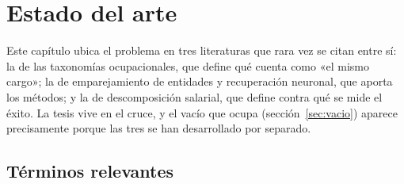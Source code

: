 \documentclass[12pt,a4paper,oneside]{report}
\begin{document}
\chapter{Estado del arte}
\label{cap:relacionados}

Este capítulo ubica el problema en tres literaturas que rara vez se citan entre sí: la de
las taxonomías ocupacionales, que define qué cuenta como «el mismo cargo»; la de
emparejamiento de entidades y recuperación neuronal, que aporta los métodos; y la de
descomposición salarial, que define contra qué se mide el éxito. La tesis vive en el
cruce, y el vacío que ocupa (sección~\ref{sec:vacio}) aparece precisamente porque las tres
se han desarrollado por separado.

\section{Términos relevantes}
\label{sec:terminos}
\end{document}
